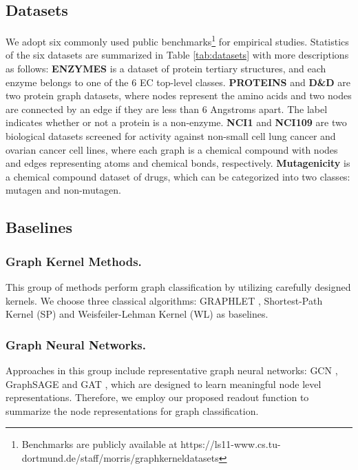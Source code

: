 \documentclass[letterpaper]{article} \usepackage{aaai20}  \usepackage{times}  \usepackage{helvet} \usepackage{courier}  \usepackage[hyphens]{url}  \usepackage{graphicx} \urlstyle{rm} \def\UrlFont{\rm}  \usepackage{graphicx}  \frenchspacing  \setlength{\pdfpagewidth}{8.5in}  \setlength{\pdfpageheight}{11in}
\begin{document}
\subsection{Datasets}
We adopt six commonly used public benchmarks\footnote{Benchmarks are publicly available at https://ls11-www.cs.tu-dortmund.de/staff/morris/graphkerneldatasets} for empirical studies. Statistics of the six datasets are summarized in Table \ref{tab:datasets} with more descriptions as follows: \textbf{ENZYMES} \cite{borgwardt2005protein} is a dataset of protein tertiary structures, and each enzyme belongs to one of the 6 EC top-level classes. \textbf{PROTEINS} and \textbf{D\&D} \cite{dobson2003distinguishing} are two protein graph datasets, where nodes represent the amino acids and two nodes are connected by an edge if they are less than 6 Angstroms apart. The label indicates whether or not a protein is a non-enzyme. \textbf{NCI1} and \textbf{NCI109} \cite{shervashidze2011weisfeiler} are two biological datasets screened for activity against non-small cell lung cancer and ovarian cancer cell lines, where each graph is a chemical compound with nodes and edges representing atoms and chemical bonds, respectively. \textbf{Mutagenicity} \cite{kazius2005derivation} is a chemical compound dataset of drugs, which can be categorized into two classes: mutagen and non-mutagen.

\subsection{Baselines}
\subsubsection{Graph Kernel Methods.}
This group of methods perform graph classification by utilizing carefully designed kernels. We choose three classical algorithms: GRAPHLET \cite{shervashidze2009efficient}, Shortest-Path Kernel (SP) \cite{borgwardt2005shortest} and Weisfeiler-Lehman Kernel (WL) \cite{shervashidze2011weisfeiler} as baselines.
\subsubsection{Graph Neural Networks.}
Approaches in this group include representative graph neural networks: GCN \cite{kipf2016semi}, GraphSAGE \cite{hamilton2017inductive} and GAT \cite{velivckovic2017graph}, which are designed to learn meaningful node level representations. Therefore, we employ our proposed readout function to summarize the node representations for graph classification.
\end{document}
